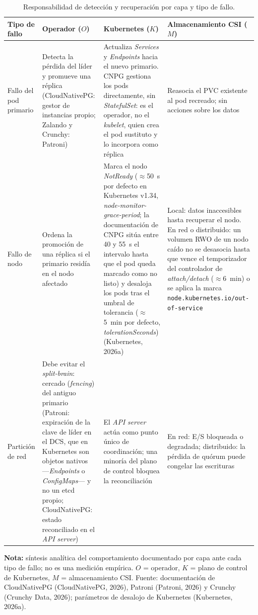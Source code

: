 \documentclass[11pt,letterpaper]{article}
\newcommand{\fignota}[1]{\par\vspace{2pt}\begingroup\footnotesize\textbf{Nota:} #1\par\endgroup}
\begin{document}
\begin{table}[htbp]
\centering
\footnotesize
\renewcommand{\arraystretch}{1.25}
\begin{tabularx}{\linewidth}{@{}>{\raggedright\arraybackslash}p{2.4cm} >{\raggedright\arraybackslash}X >{\raggedright\arraybackslash}X >{\raggedright\arraybackslash}X@{}}
\toprule
\textbf{Tipo de fallo} & \textbf{Operador ($O$)} & \textbf{Kubernetes ($K$)} & \textbf{Almacenamiento CSI ($M$)} \\
\midrule
Fallo del pod primario &
Detecta la pérdida del líder y promueve una réplica (CloudNativePG: gestor de instancias propio; Zalando y Crunchy: Patroni) &
Actualiza \textit{Services} y \textit{Endpoints} hacia el nuevo primario. CNPG gestiona los pods directamente, sin \textit{StatefulSet}: es el operador, no el \textit{kubelet}, quien crea el pod sustituto y lo incorpora como réplica &
Reasocia el PVC existente al pod recreado; sin acciones sobre los datos \\
Fallo de nodo &
Ordena la promoción de una réplica si el primario residía en el nodo afectado &
Marca el nodo \textit{NotReady} ($\approx$50~s por defecto en Kubernetes v1.34, \textit{node-monitor-grace-period}; la documentación de CNPG sitúa entre 40 y 55~s el intervalo hasta que el pod queda marcado como no listo) y desaloja los pods tras el umbral de tolerancia ($\approx$5~min por defecto, \textit{tolerationSeconds}) (Kubernetes, 2026a) &
Local: datos inaccesibles hasta recuperar el nodo. En red o distribuido: un volumen RWO de un nodo caído no se desasocia hasta que vence el temporizador del controlador de \textit{attach/detach} ($\approx$6~min) o se aplica la marca \texttt{node.kubernetes.io/\allowbreak out-of-\allowbreak service} \\
Partición de red &
Debe evitar el \textit{split-brain}: cercado (\textit{fencing}) del antiguo primario (Patroni: expiración de la clave de líder en el DCS, que en Kubernetes son objetos nativos —\textit{Endpoints} o \textit{ConfigMaps}— y no un etcd propio; CloudNativePG: estado reconciliado en el \textit{API server}) &
El \textit{API server} actúa como punto único de coordinación; una minoría del plano de control bloquea la reconciliación &
En red: E/S bloqueada o degradada; distribuido: la pérdida de quórum puede congelar las escrituras \\
\bottomrule
\end{tabularx}
\caption{Responsabilidad de detección y recuperación por capa y tipo de fallo.}
\label{tab:s1}
\fignota{síntesis analítica del comportamiento documentado por capa ante cada tipo de fallo; no es una medición empírica. $O$ = operador, $K$ = plano de control de Kubernetes, $M$ = almacenamiento CSI. Fuente: documentación de CloudNativePG (CloudNativePG, 2026), Patroni (Patroni, 2026) y Crunchy (Crunchy Data, 2026); parámetros de desalojo de Kubernetes (Kubernetes, 2026a).}
\end{table}
\end{document}
